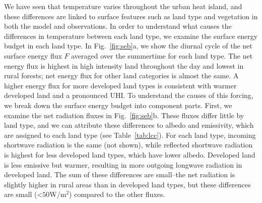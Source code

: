 \documentclass[draft,linenumbers]{agujournal}
\begin{document}
We have seen that temperature varies throughout the urban heat island, and these differences are linked to surface features such as land type and vegetation in both the model and observations. 
In order to understand what causes the differences in temperature between each land type, we examine the surface energy budget in each land type. 
 In Fig.~\ref{fig:seb}a, we show the diurnal cycle of the net surface energy flux $F$ averaged over the summertime for each land type. The net energy flux is highest in high intensity land throughout the day and lowest in rural forests; net energy flux for other land categories is almost the same. %
 A higher energy flux for more developed land types is consistent with warmer developed land and a pronounced UHI. 
 To understand the causes of this forcing, we break down the surface energy budget into component parts. First, we examine the net radiation fluxes in Fig.~\ref{fig:seb}b. These fluxes differ little by land type, and we can attribute these differences to albedo and emissivity, which are assigned to each land type (see Table~\ref{tab:lcc}). 
For each land type, incoming shortwave radiation is the same (not shown), while reflected shortwave radiation is highest for less developed land types, which have lower albedo. 
Developed land is less emissive but warmer, resulting in more outgoing longwave radiation in developed land. %
The sum of these differences are small--the net radiation is slightly higher in rural areas than in developed land types, but these differences are small (<$50$W/m$^2$) compared to the other fluxes. 
\end{document}
